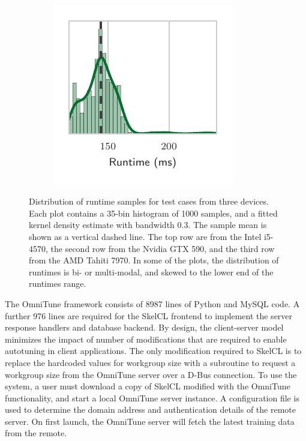 \documentclass[nonatbib,preprint,nocopyrightspace,9pt]{sigplanconf}
\begin{document}
\begin{figure}
\begin{subfigure}[h]{.32\columnwidth}
\vspace{-1.5em} %
\caption{}
\label{fig:runtimes-histogram-8}
\end{subfigure}
~%
\begin{subfigure}[h]{.32\columnwidth}
\centering
\includegraphics[width=\textwidth]{img/runtimes_histogram_9}
\vspace{-1.5em} %
\caption{}
\label{fig:runtimes-histogram-9}
\end{subfigure}
\caption[Distribution of stencil code runtimes]{%
  Distribution of runtime samples for test cases from three
  devices. Each plot contains a 35-bin histogram of 1000 samples, and
  a fitted kernel density estimate with bandwidth 0.3. The sample mean
  is shown as a vertical dashed line. The top row are from the Intel
  i5-4570, the second row from the Nvidia GTX 590, and the third row
  from the AMD Tahiti 7970. In some of the plots, the distribution of
  runtimes is bi- or multi-modal, and skewed to the lower end of the
  runtimes range.%
}
\label{fig:runtime-histograms}
\end{figure}

The OmniTune framework consists of 8987 lines of Python and MySQL
code. A further 976 lines are required for the SkelCL frontend to
implement the server response handlers and database backend. By
design, the client-server model minimizes the impact of number of
modifications that are required to enable autotuning in client
applications. The only modification required to SkelCL is to replace
the hardcoded values for workgroup size with a subroutine to request a
workgroup size from the OmniTune server over a D-Bus connection. To
use the system, a user must download a copy of SkelCL modified with
the OmniTune functionality, and start a local OmniTune server
instance. A configuration file is used to determine the domain address
and authentication details of the remote server. On first launch, the
OmniTune server will fetch the latest training data from the remote.
\end{document}
